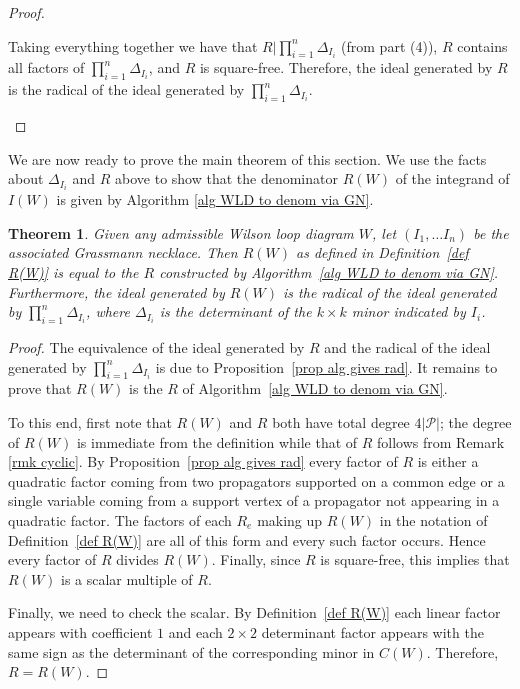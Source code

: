 \documentclass[11pt]{article}
\newtheorem{thm}{Theorem}[section]
\theoremstyle{remark}
\theoremstyle{definition}
\begin{document}
\begin{proof}
\begin{enumerate}
Taking everything together we have that $R|\prod_{i=1}^n \Delta_{I_i}$ (from part (4)), $R$ contains all factors of $\prod_{i=1}^n \Delta_{I_i}$, and $R$ is square-free.  Therefore, the ideal generated by $R$ is the radical of the ideal generated by $\prod_{i=1}^n \Delta_{I_i}$.
  \end{enumerate}
\end{proof}

We are now ready to prove the main theorem of this section. We use the facts about $\Delta_{I_i}$ and $R$ above to show that the denominator $R(W)$ of the integrand of $I(W)$ is given by Algorithm \ref{alg WLD to denom via GN}.

\begin{thm}\label{thm denom}
  Given any admissible Wilson loop diagram $W$, let $(I_1, \ldots I_n)$ be the associated Grassmann necklace. Then $R(W)$ as defined in Definition~\ref{def R(W)} is equal to the $R$ constructed by Algorithm~\ref{alg WLD to denom via GN}. Furthermore, the ideal generated by $R(W)$ is the radical of the ideal generated by $\prod_{i=1}^n \Delta_{I_i}$, where $\Delta_{I_i}$ is the determinant of the $k \times k$ minor indicated by $I_i$.  
\end{thm}

\begin{proof}
The equivalence of the ideal generated by $R$ and the radical of the ideal generated by $\prod_{i=1}^n \Delta_{I_i}$ is due to Proposition~\ref{prop alg gives rad}.  It remains to prove that $R(W)$ is the $R$ of Algorithm~\ref{alg WLD to denom via GN}.

To this end, first note that $R(W)$ and $R$ both have total degree $4|\mathcal{P}|$; the degree of $R(W)$ is immediate from the definition while that of $R$ follows from Remark \ref{rmk cyclic}.  By Proposition~\ref{prop alg gives rad} every factor of $R$ is either a quadratic factor coming from two propagators supported on a common edge or a single variable coming from a support vertex of a propagator not appearing in a quadratic factor.  The factors of each $R_e$ making up $R(W)$ in the notation of Definition~\ref{def R(W)} are all of this form and every such factor occurs.  Hence every factor of $R$ divides $R(W)$.
Finally, since $R$ is square-free, this implies that $R(W)$ is a scalar multiple of $R$.

Finally, we need to check the scalar.  By Definition~\ref{def R(W)} each linear factor appears with coefficient $1$ and each $2\times 2$ determinant factor appears with the same sign as the determinant of the corresponding minor in $C(W)$.  Therefore, $R=R(W)$.
\end{proof}
\end{document}
